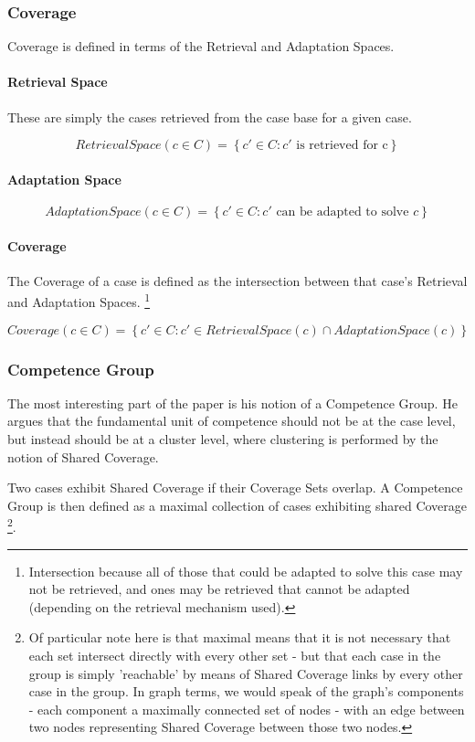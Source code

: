 \documentclass[a4paper,11pt]{report}
\begin{document}
\subsubsection{Coverage}
Coverage is defined in terms of the Retrieval and Adaptation Spaces.

\paragraph{Retrieval Space}

These are simply the cases retrieved from the case base for a given case.

\[ RetrievalSpace(c \in C) = \left\{ c \prime \in C : c \prime \text{ is retrieved for c} \right\} \]

\paragraph{Adaptation Space}

\[ AdaptationSpace(c \in C) = \left\{ c \prime \in C : c \prime \text{ can be adapted to solve } c \right\} \]

\paragraph{Coverage}

The Coverage of a case is defined as the intersection between that case's Retrieval and Adaptation Spaces. \footnote{Intersection because all of those that could be adapted to solve this case may not be retrieved, and ones may be retrieved that cannot be adapted (depending on the retrieval mechanism used).}

\[ Coverage(c \in C) = \left\{ c \prime \in C : c \prime \in RetrievalSpace(c) \cap AdaptationSpace(c) \right\} \]


\subsubsection{Competence Group}
The most interesting part of the paper is his notion of a Competence Group. He argues that the fundamental unit of competence should not be at the case level, but instead should be at a cluster level, where clustering is performed by the notion of Shared Coverage.

Two cases exhibit Shared Coverage if their Coverage Sets overlap. A Competence Group is then defined as a maximal  collection  of  cases  exhibiting  shared Coverage \footnote{Of particular note here is that maximal means that it is not necessary that each set intersect directly with every other set - but that each case in the group is simply 'reachable' by means of Shared Coverage links by every other case in the group. In graph terms, we would speak of the graph's components - each component a maximally connected set of nodes - with an edge between two nodes representing Shared Coverage between those two nodes.}.
\end{document}
